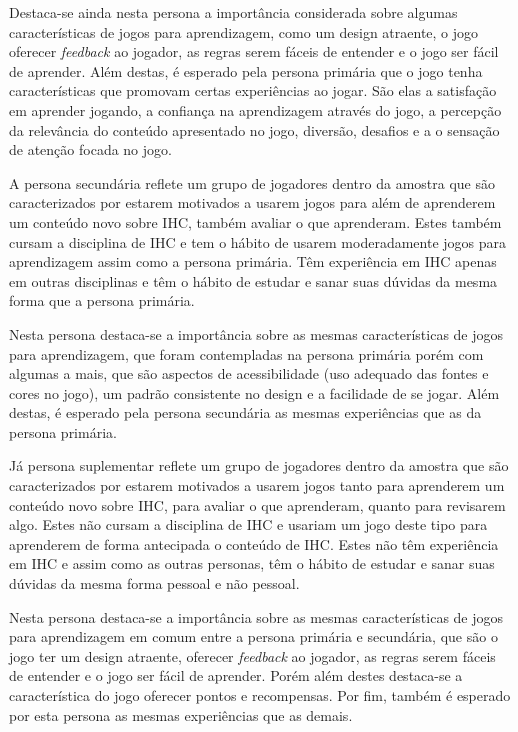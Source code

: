 Destaca-se ainda nesta persona a importância considerada sobre algumas características de jogos para aprendizagem, como um design atraente, o jogo oferecer \textit{feedback} ao jogador, as regras serem fáceis de entender e o jogo ser fácil de aprender. Além destas, é esperado pela persona primária que o jogo tenha características que promovam certas experiências ao jogar. São elas a satisfação em aprender jogando, a confiança na aprendizagem através do jogo, a percepção da relevância do conteúdo apresentado no jogo, diversão, desafios e a o sensação de atenção focada no jogo.

A persona secundária reflete um grupo de jogadores dentro da amostra que são caracterizados por estarem motivados a usarem jogos para além de aprenderem um conteúdo novo sobre IHC, também avaliar o que aprenderam. Estes também cursam a disciplina de IHC e tem o hábito de usarem moderadamente jogos para aprendizagem assim como a persona primária. Têm experiência em IHC apenas em outras disciplinas e têm o hábito de estudar e sanar suas dúvidas da mesma forma que a persona primária.

Nesta persona destaca-se a importância sobre as mesmas características de jogos para aprendizagem, que foram contempladas na persona primária porém com algumas a mais, que são aspectos de acessibilidade (uso adequado das fontes e cores no jogo), um padrão consistente no design e a facilidade de se jogar. Além destas, é esperado pela persona secundária as mesmas experiências que as da persona primária.

Já persona suplementar reflete um grupo de jogadores dentro da amostra que são caracterizados por estarem motivados a usarem jogos tanto para aprenderem um conteúdo novo sobre IHC, para avaliar o que aprenderam, quanto para revisarem algo. Estes não cursam a disciplina de IHC e usariam um jogo deste tipo para aprenderem de forma antecipada o conteúdo de IHC. Estes não têm experiência em IHC e assim como as outras personas, têm o hábito de estudar e sanar suas dúvidas da mesma forma pessoal e não pessoal.

Nesta persona destaca-se a importância sobre as mesmas características de jogos para aprendizagem em comum entre a persona primária e secundária, que são o jogo ter um design atraente, oferecer \textit{feedback} ao jogador, as regras serem fáceis de entender e o jogo ser fácil de aprender. Porém além destes destaca-se a característica do jogo oferecer pontos e recompensas. Por fim, também é esperado por esta persona as mesmas experiências que as demais.

